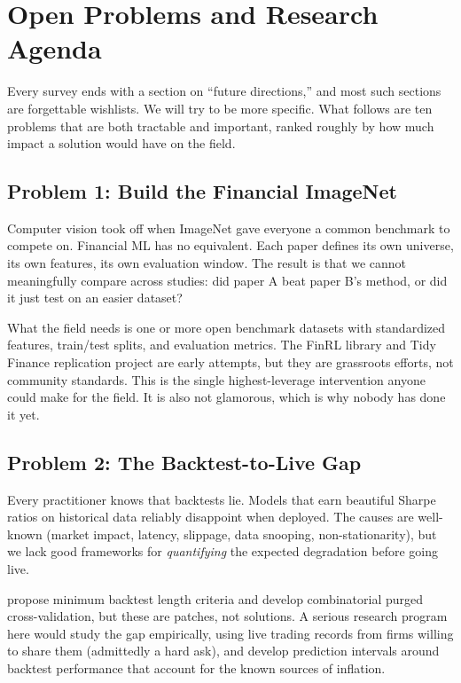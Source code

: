 \section{Open Problems and Research Agenda}\label{sec:open_problems}

Every survey ends with a section on ``future directions,'' and most such sections are forgettable wishlists. We will try to be more specific. What follows are ten problems that are both tractable and important, ranked roughly by how much impact a solution would have on the field.

\subsection{Problem 1: Build the Financial ImageNet}

Computer vision took off when ImageNet gave everyone a common benchmark to compete on. Financial ML has no equivalent. Each paper defines its own universe, its own features, its own evaluation window. The result is that we cannot meaningfully compare across studies: did paper A beat paper B's method, or did it just test on an easier dataset?

What the field needs is one or more open benchmark datasets with standardized features, train/test splits, and evaluation metrics. The FinRL library \citep{Wang2021} and Tidy Finance replication project are early attempts, but they are grassroots efforts, not community standards. This is the single highest-leverage intervention anyone could make for the field. It is also not glamorous, which is why nobody has done it yet.

\subsection{Problem 2: The Backtest-to-Live Gap}

Every practitioner knows that backtests lie. Models that earn beautiful Sharpe ratios on historical data reliably disappoint when deployed. The causes are well-known (market impact, latency, slippage, data snooping, non-stationarity), but we lack good frameworks for \textit{quantifying} the expected degradation before going live.

\citet{Bailey2014} propose minimum backtest length criteria and \citet{DePrado2018} develop combinatorial purged cross-validation, but these are patches, not solutions. A serious research program here would study the gap empirically, using live trading records from firms willing to share them (admittedly a hard ask), and develop prediction intervals around backtest performance that account for the known sources of inflation.

